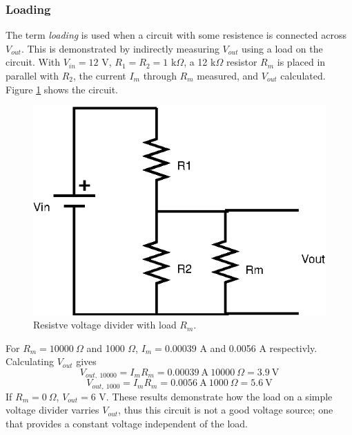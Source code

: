 \documentclass[11pt,onecolumn]{article}
\begin{document}
\subsubsection{Loading}\label{sec:Loading}
The term {\em loading} is used when a circuit with some resistence is connected across $V_{out}$. This is demonstrated by indirectly measuring $V_{out}$ using a load on the circuit. With $V_{in} = 12$ V, $R_1 = R_2 = 1$ k$\Omega$, a 12 k$\Omega$ resistor $R_m$ is placed in parallel with $R_2$, the current $I_m$ through $R_m$ measured, and $V_{out}$ calculated. Figure \ref{fig:Resistive_VD_loaded} shows the circuit.
\begin{figure}
\begin{center}
\includegraphics{Diagram2.eps}
\end{center}
%
\caption{Resistve voltage divider with load $R_m$.}\label{fig:Resistive_VD_loaded}
\end{figure}

For $R_m = 10000\ \Omega$ and 1000 $\Omega$, $I_m = 0.00039$ A and 0.0056 A respectivly. Calculating $V_{out}$ gives
\begin{displaymath}
V_{out,\ 10000} = I_m R_m = 0.00039\ \mathrm{A}\ 10000\ \Omega = 3.9\ \mathrm{V}
\end{displaymath}
\begin{displaymath}
V_{out,\ 1000} = I_m R_m = 0.0056\ \mathrm{A}\ 1000\ \Omega = 5.6\ \mathrm{V}
\end{displaymath}
If $R_m = 0\ \Omega$, $V_{out} = 6$ V. These results demonstrate how the load on a simple voltage divider varries $V_{out}$, thus this circuit is not a good voltage source; one that provides a constant voltage independent of the load.
\end{document}
